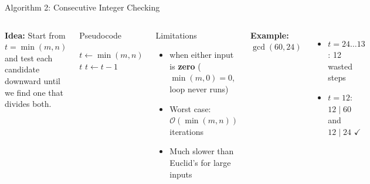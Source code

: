 \documentclass[aspectratio=169]{beamer}
\begin{document}
\begin{frame}[shrink=12]{Algorithm 2: Consecutive Integer Checking}
  \begin{columns}[T]
      \textbf{Idea:} Start from $t = \min(m,n)$ and test each
      candidate downward until we find one that divides both.
      \vspace{0.4em}
      \begin{block}{Pseudocode}
        \begin{algorithmic}[1]
          \State $t \gets \min(m, n)$
              \State \Return $t$
            \EndIf
            \State $t \gets t - 1$
          \EndWhile
        \end{algorithmic}
      \end{block}
      \begin{alertblock}{Limitations}
        \begin{itemize}
          \item {} when either input is \textbf{zero}
                ($\min(m,0)=0$, loop never runs)
          \item Worst case: $\mathcal{O}(\min(m,n))$ iterations
          \item Much slower than Euclid's for large inputs
        \end{itemize}
      \end{alertblock}
      \vspace{0.4em}
      \textbf{Example:} $\gcd(60,24)$
      \begin{itemize}
        \item $t=24\ldots13$: 12 wasted steps
        \item $t=12$: $12 \mid 60$ and $12 \mid 24$ $\checkmark$
      \end{itemize}
  \end{columns}
\end{frame}
\end{document}

